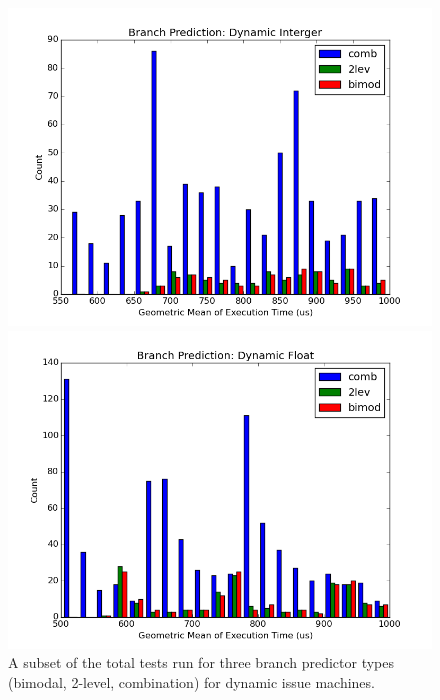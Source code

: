 \documentclass[paper=a4, fontsize=12pt]{scrartcl} %
\numberwithin{equation}{section} %
\numberwithin{figure}{section} %
\numberwithin{table}{section} %
\begin{document}
\begin{figure}
\centering
\begin{minipage}{0.5\textwidth}
\centering
	\includegraphics[width=\linewidth]{graphs/branch_prediction/Branch_Prediction_Dynamic_Interger.png}
\end{minipage}\hfill
\begin{minipage}{0.5\textwidth}
\centering
 \includegraphics[width=\linewidth]{graphs/branch_prediction/Branch_Prediction_Dynamic_Float.png}
\end{minipage}

\caption{A subset of the total tests run for three branch predictor types (bimodal, 2-level, combination) for dynamic issue machines.}
\label{fig:bpdi}
\end{figure}
\end{document}
